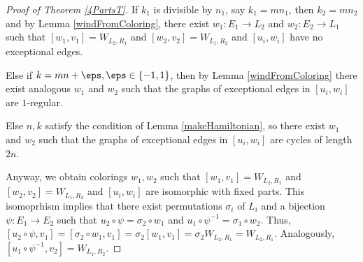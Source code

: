 \documentclass[12pt]{article}
\newtheorem{lemma}{Lemma}[section]
\theoremstyle{definition}
\theoremstyle{plain}
\begin{document}








\begin{proof}[Proof of Theorem \ref{4PartsT}]
 If $k_1$ is divisible by $n_1$, say $k_1 = m n_1$, then $k_2 = m n_2$ and by Lemma \ref{windFromColoring}, there exist $w_1 : E_1 \rightarrow L_2$ and $w_2 : E_2 \rightarrow L_1$ such that $[w_1,v_1]=W_{L_2,R_1}$ and $[w_2,v_2]=W_{L_1,R_2}$ and $[u_i,w_i]$ have no exceptional edges.
 
Else if $k = mn+ \eps, \eps \in \{-1, 1\}$, then by Lemma \ref{windFromColoring} there exist analogous $w_1$ and $w_2$ such that the graphs of exceptional edges in $[u_i, w_i]$ are $1$-regular.

Else $n, k$ satisfy the condition of Lemma \ref{makeHamiltonian}, so there exist $w_1$ and $w_2$ such that the graphs of exceptional edges in $[u_i,w_i]$ are cycles of length $2n$. 

Anyway, we obtain colorings $w_1,w_2$ such that $[w_1,v_1]=W_{L_2,R_1}$ and $[w_2,v_2]=W_{L_1,R_2}$ and $[u_i,w_i]$ are isomorphic with fixed parts. This isomoprhism implies that there exist permutations $\sigma_i$ of $L_i$ and a bijection $\psi : E_1 \rightarrow E_2$ such that $u_2 \circ \psi = \sigma_2 \circ w_1$ and $u_1 \circ \psi^{-1} = \sigma_1 \circ w_2$. Thus, $[u_2 \circ \psi, v_1] = [\sigma_2 \circ w_1, v_1] = \sigma_2 [w_1, v_1] = \sigma_2 W_{L_2, R_1} = W_{L_2, R_1}$. Analogously, $[u_1 \circ \psi^{-1}, v_2] = W_{L_1, R_2}$.
\end{proof}
\end{document}
